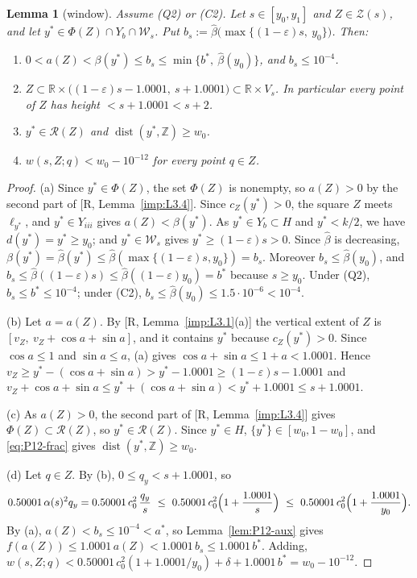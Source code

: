 \documentclass[11pt]{amsart}
\newcommand{\R}{\mathbb R}
\newcommand{\Z}{\mathbb Z}
\newcommand{\eps}{\varepsilon}
\newcommand{\cR}{\mathcal R}
\newcommand{\cZ}{\mathcal Z}
\newcommand{\dist}{\operatorname{dist}}
\newcommand{\frc}[1]{\{#1\}}
\newtheorem{lemma}[theorem]{Lemma}
\theoremstyle{definition}
\theoremstyle{remark}
\numberwithin{equation}{section}
\begin{document}
\begin{lemma}[window]\label{lem:P12-window}
Assume \textup{(Q2)} or \textup{(C2)}. Let $s\in[y_0,y_1]$ and $Z\in\cZ(s)$, and let $y^*\in\Phi(Z)\cap Y_b\cap\mathcal W_s$. Put $b_s:=\hat\beta\bigl(\max\{(1-\eps)s,\ y_0\}\bigr)$. Then:
\begin{enumerate}[label=\textup{(\alph*)}]
\item $0<a(Z)<\beta(y^*)\le b_s\le\min\{b^*,\ \hat\beta(y_0)\}$, and $b_s\le10^{-4}$.
\item $Z\subset\R\times\bigl((1-\eps)s-1.0001,\ s+1.0001\bigr)\subset\R\times V_s$. In particular every point of $Z$ has height $<s+1.0001<s+2$.
\item $y^*\in\cR(Z)$ and $\dist(y^*,\Z)\ge w_0$.
\item $w(s,Z;q)<w_0-10^{-12}$ for every point $q\in Z$.
\end{enumerate}
\end{lemma}

\begin{proof}
(a) Since $y^*\in\Phi(Z)$, the set $\Phi(Z)$ is nonempty, so $a(Z)>0$ by the second part of [R, Lemma~\ref{imp:L3.4}]. Since $c_Z(y^*)>0$, the square $Z$ meets $\ell_{y^*}$, and $y^*\in Y_{iii}$ gives $a(Z)<\beta(y^*)$. As $y^*\in Y_b\subset H$ and $y^*<k/2$, we have $d(y^*)=y^*\ge y_0$; and $y^*\in\mathcal W_s$ gives $y^*\ge(1-\eps)s>0$. Since $\hat\beta$ is decreasing, $\beta(y^*)=\hat\beta(y^*)\le\hat\beta(\max\{(1-\eps)s,y_0\})=b_s$. Moreover $b_s\le\hat\beta(y_0)$, and $b_s\le\hat\beta((1-\eps)s)\le\hat\beta((1-\eps)y_0)=b^*$ because $s\ge y_0$. Under (Q2), $b_s\le b^*\le10^{-4}$; under (C2), $b_s\le\hat\beta(y_0)\le1.5\cdot10^{-6}<10^{-4}$.

(b) Let $a=a(Z)$. By [R, Lemma~\ref{imp:L3.1}(a)] the vertical extent of $Z$ is $[v_Z,\ v_Z+\cos a+\sin a]$, and it contains $y^*$ because $c_Z(y^*)>0$. Since $\cos a\le1$ and $\sin a\le a$, (a) gives $\cos a+\sin a\le1+a<1.0001$. Hence $v_Z\ge y^*-(\cos a+\sin a)>y^*-1.0001\ge(1-\eps)s-1.0001$ and $v_Z+\cos a+\sin a\le y^*+(\cos a+\sin a)<y^*+1.0001\le s+1.0001$.

(c) As $a(Z)>0$, the second part of [R, Lemma~\ref{imp:L3.4}] gives $\Phi(Z)\subset\cR(Z)$, so $y^*\in\cR(Z)$. Since $y^*\in H$, $\frc{y^*}\in[w_0,1-w_0]$, and \eqref{eq:P12-frac} gives $\dist(y^*,\Z)\ge w_0$.

(d) Let $q\in Z$. By (b), $0\le q_y<s+1.0001$, so
\[
0.50001\,\alpha(s)^2q_y=0.50001\,c_0^2\,\frac{q_y}s\ \le\ 0.50001\,c_0^2\Bigl(1+\frac{1.0001}s\Bigr)\ \le\ 0.50001\,c_0^2\Bigl(1+\frac{1.0001}{y_0}\Bigr).
\]
By (a), $a(Z)<b_s\le10^{-4}<a^*$, so Lemma~\ref{lem:P12-aux} gives $f(a(Z))\le1.0001\,a(Z)<1.0001\,b_s\le1.0001\,b^*$. Adding, $w(s,Z;q)<0.50001\,c_0^2(1+1.0001/y_0)+\delta+1.0001\,b^*=w_0-10^{-12}$.
\end{proof}
\end{document}
